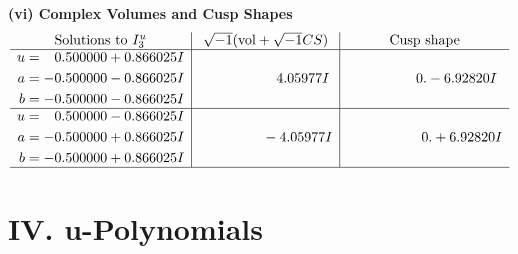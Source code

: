 \documentclass[1p]{elsarticle_modified}
\theoremstyle{definition}
\newcommand{\I}{\sqrt{-1}}
\begin{document}
\newpage\flushleft \textbf{(vi) Complex Volumes and Cusp Shapes}
$$\begin{array}{c|c|c}  
\text{Solutions to }I^u_{3}& \I (\text{vol} + \sqrt{-1}CS) & \text{Cusp shape}\\
 \hline 
\begin{aligned}
u &= \phantom{-}0.500000 + 0.866025 I \\
a &= -0.500000 - 0.866025 I \\
b &= -0.500000 - 0.866025 I\end{aligned}
 & \phantom{-0.000000 -}4.05977 I & \phantom{-0.000000 } 0. - 6.92820 I \\ \hline\begin{aligned}
u &= \phantom{-}0.500000 - 0.866025 I \\
a &= -0.500000 + 0.866025 I \\
b &= -0.500000 + 0.866025 I\end{aligned}
 & \phantom{-0.000000 } -4.05977 I & \phantom{-0.000000 -}0. + 6.92820 I\\
 \hline 
 \end{array}$$\newpage
\newpage\renewcommand{\arraystretch}{1}
\centering \section*{ IV. u-Polynomials}
\end{document}
